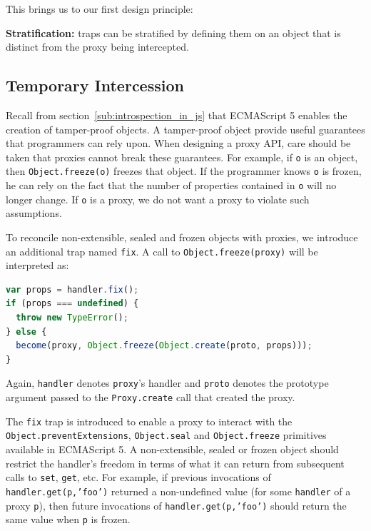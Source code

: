 \documentclass{sig-alternate}
\begin{document}
This brings us to our first design principle:

\textbf{Stratification:} traps can be stratified by defining them on an object that is distinct from the proxy being intercepted.

\subsection{Temporary Intercession}
\label{sub:immutability}

Recall from section~\ref{sub:introspection_in_js} that ECMAScript 5 enables the creation of tamper-proof objects. A tamper-proof object provide useful guarantees that programmers can rely upon. When designing a proxy API, care should be taken that proxies cannot break these guarantees. For example, if \texttt{o} is an object, then \texttt{Object.freeze(o)} freezes that object. If the programmer knows \texttt{o} is frozen, he can rely on the fact that the number of properties contained in \texttt{o} will no longer change. If \texttt{o} is a proxy, we do not want a proxy to violate such assumptions.

To reconcile non-extensible, sealed and frozen objects with proxies, we introduce an additional trap named \texttt{fix}. A call to \texttt{Object.freeze(proxy)} will be interpreted as:

\begin{lstlisting}[language=javascript]
var props = handler.fix();
if (props === undefined) {
  throw new TypeError();
} else {
  become(proxy, Object.freeze(Object.create(proto, props)));
}
\end{lstlisting}

Again, \texttt{handler} denotes \texttt{proxy}'s handler and \texttt{proto} denotes the prototype argument passed to the \texttt{Proxy.create} call that created the proxy.

The \texttt{fix} trap is introduced to enable a proxy to interact with the \texttt{Object.preventExtensions}, \texttt{Object.seal} and \texttt{Object.freeze} primitives available in ECMAScript 5. A non-extensible, sealed or frozen object should restrict the handler's freedom in terms of what it can return from subsequent calls to \texttt{set}, \texttt{get}, etc. For example, if previous invocations of \texttt{handler.get(p,'foo')} returned a non-undefined value (for some \texttt{handler} of a proxy \texttt{p}), then future invocations of \texttt{handler.get(p,'foo')} should return the same value when \texttt{p} is frozen.
\end{document}

